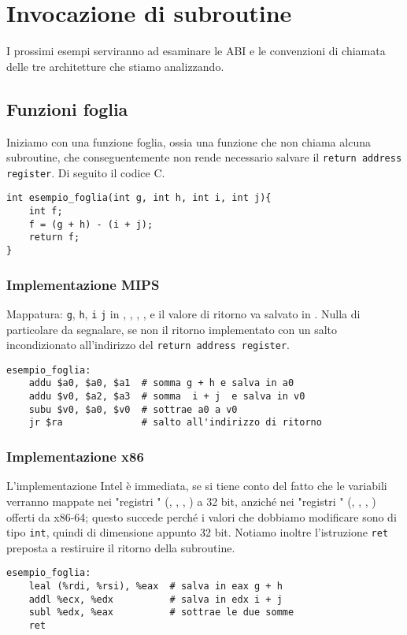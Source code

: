 \documentclass[class=book, crop=false, oneside]{standalone}
\begin{document}
\section{Invocazione di subroutine}
I prossimi esempi serviranno ad esaminare le ABI e le convenzioni di chiamata delle tre architetture che stiamo analizzando.
\subsection*{Funzioni foglia}
Iniziamo con una funzione foglia, ossia una funzione che non chiama alcuna subroutine, che conseguentemente non rende necessario salvare il \texttt{return address register}. Di seguito il codice C.
\begin{verbatim}
int esempio_foglia(int g, int h, int i, int j){
	int f;
	f = (g + h) - (i + j);
	return f;
}
\end{verbatim}

\subsubsection{Implementazione MIPS}
Mappatura: \texttt{g}, \texttt{h}, \texttt{i} \texttt{j} in , , , , e il valore di ritorno va salvato in . Nulla di particolare da segnalare, se non il ritorno implementato con un salto incondizionato all'indirizzo del \texttt{return address register}.
\begin{verbatim}
esempio_foglia:
	addu $a0, $a0, $a1  # somma g + h e salva in a0
	addu $v0, $a2, $a3  # somma  i + j  e salva in v0
	subu $v0, $a0, $v0  # sottrae a0 a v0
	jr $ra              # salto all'indirizzo di ritorno
\end{verbatim}

\subsubsection{Implementazione x86}
L'implementazione Intel è immediata, se si tiene conto del fatto che le variabili verranno mappate nei "registri " (, , , ) a 32 bit, anziché nei "registri " (, , , ) offerti da x86-64; questo succede perché i valori che dobbiamo modificare sono di tipo \texttt{int}, quindi di dimensione appunto 32 bit. Notiamo inoltre l'istruzione \texttt{ret} preposta a restiruire il ritorno della subroutine.
\begin{verbatim}
esempio_foglia:
	leal (%rdi, %rsi), %eax  # salva in eax g + h
	addl %ecx, %edx          # salva in edx i + j
	subl %edx, %eax          # sottrae le due somme
	ret
\end{verbatim}
\end{document}
